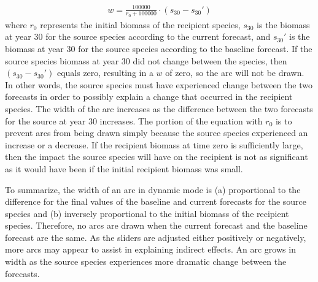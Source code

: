 \begin{align}
w = \frac{100000}{r_{0} + 100000} \cdot (s_{30} - s_{30}')
\end{align}
where $r_{0}$ represents the initial biomass of the recipient species, $s_{30}$ is the biomass at year 30 for the source species according to the current forecast, and $s_{30}'$ is the biomass at year 30 for the source species according to the baseline forecast.  If the source species biomass at year 30 did not change between the species, then $(s_{30} - s_{30}')$ equals zero, resulting in a $w$ of zero, so the arc will not be drawn.  In other words, the source species must have experienced change between the two forecasts in order to possibly explain a change that occurred in the recipient species.  The width of the arc increases as the difference between the two forecasts for the source at year 30 increases.  The portion of the equation with $r_{0}$ is to prevent arcs from being drawn simply because the source species experienced an increase or a decrease.  If the recipient biomass at time zero is sufficiently large, then the impact the source species will have on the recipient is not as significant as it would have been if the initial recipient biomass was small.

To summarize, the width of an arc in dynamic mode is (a) proportional to the difference for the final values of the baseline and current forecasts for the source species and (b) inversely proportional to the initial biomass of the recipient species.  Therefore, no arcs are drawn when the current forecast and the baseline forecast are the same.  As the sliders are adjusted either positively or negatively, more arcs may appear to assist in explaining indirect effects.  An arc grows in width as the source species experiences more dramatic change between the forecasts.

